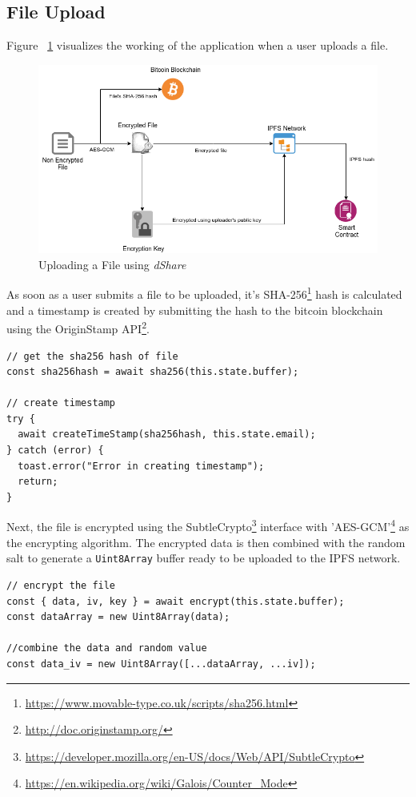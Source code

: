 \documentclass[]{article}
\begin{document}
		\newpage
		\subsection{File Upload}
		Figure ~\ref{fig:upload} visualizes the working of the application when a user uploads a file.
		
		\begin{figure}[h]
			\includegraphics[width=\linewidth]{upload.png}
			\caption{Uploading a File using \textit{dShare}}
			\label{fig:upload}
		\end{figure}
		
		As soon as a user submits a file to be uploaded, it's SHA-256\footnote{\url{https://www.movable-type.co.uk/scripts/sha256.html}} hash is calculated and a timestamp is created by submitting the hash to the bitcoin blockchain using the OriginStamp API\footnote{\url{http://doc.originstamp.org/}}.
		
\begin{verbatim}
// get the sha256 hash of file
const sha256hash = await sha256(this.state.buffer);

// create timestamp
try {
  await createTimeStamp(sha256hash, this.state.email);
} catch (error) {
  toast.error("Error in creating timestamp");
  return;
}
\end{verbatim}

		Next, the file is encrypted using the SubtleCrypto\footnote{\url{https://developer.mozilla.org/en-US/docs/Web/API/SubtleCrypto}} interface with 'AES-GCM'\footnote{\url{https://en.wikipedia.org/wiki/Galois/Counter_Mode}} as the encrypting algorithm. The encrypted data is then combined with the random salt to generate a \texttt{Uint8Array} buffer ready to be uploaded to the IPFS network.

\begin{verbatim}
// encrypt the file
const { data, iv, key } = await encrypt(this.state.buffer);
const dataArray = new Uint8Array(data);

//combine the data and random value
const data_iv = new Uint8Array([...dataArray, ...iv]);
\end{verbatim}
\end{document}

